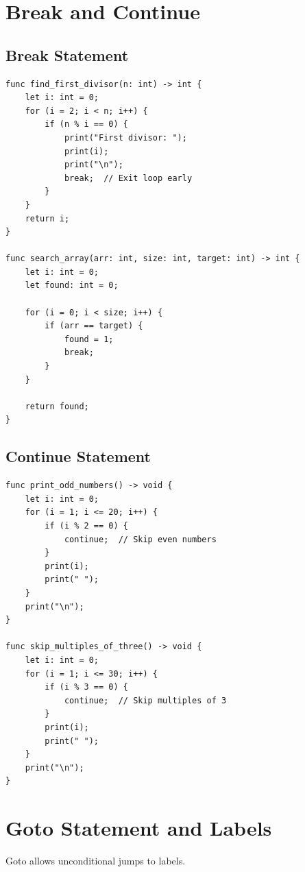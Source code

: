 \documentclass[12pt,a4paper,oneside]{book}
\begin{document}
\section{Break and Continue}

\subsection{Break Statement}

\begin{lstlisting}[style=algo, caption={Using Break}]
func find_first_divisor(n: int) -> int {
    let i: int = 0;
    for (i = 2; i < n; i++) {
        if (n % i == 0) {
            print("First divisor: ");
            print(i);
            print("\n");
            break;  // Exit loop early
        }
    }
    return i;
}

func search_array(arr: int, size: int, target: int) -> int {
    let i: int = 0;
    let found: int = 0;
    
    for (i = 0; i < size; i++) {
        if (arr == target) {
            found = 1;
            break;
        }
    }
    
    return found;
}
\end{lstlisting}

\subsection{Continue Statement}

\begin{lstlisting}[style=algo, caption={Using Continue}]
func print_odd_numbers() -> void {
    let i: int = 0;
    for (i = 1; i <= 20; i++) {
        if (i % 2 == 0) {
            continue;  // Skip even numbers
        }
        print(i);
        print(" ");
    }
    print("\n");
}

func skip_multiples_of_three() -> void {
    let i: int = 0;
    for (i = 1; i <= 30; i++) {
        if (i % 3 == 0) {
            continue;  // Skip multiples of 3
        }
        print(i);
        print(" ");
    }
    print("\n");
}
\end{lstlisting}

\section{Goto Statement and Labels}

Goto allows unconditional jumps to labels.
\end{document}
